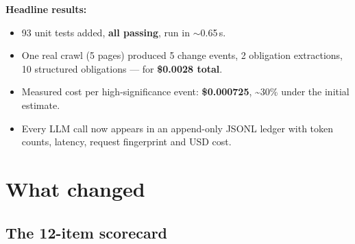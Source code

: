 \documentclass[11pt,a4paper]{article}
\begin{document}
\vspace{0.4em}
\noindent\textbf{Headline results:}
\begin{itemize}[leftmargin=1.4em,itemsep=2pt]
  \item 93 unit tests added, \textbf{all passing}, run in $\sim$0.65\,s.
  \item One real crawl (5 pages) produced 5 change events, 2 obligation
        extractions, 10 structured obligations --- for
        \textbf{\$0.0028 total}.
  \item Measured cost per high-significance event:
        \textbf{\$0.000725}, \textasciitilde30\% under the initial estimate.
  \item Every LLM call now appears in an append-only JSONL ledger with
        token counts, latency, request fingerprint and USD cost.
\end{itemize}

\section{What changed}

\subsection{The 12-item scorecard}
\end{document}
